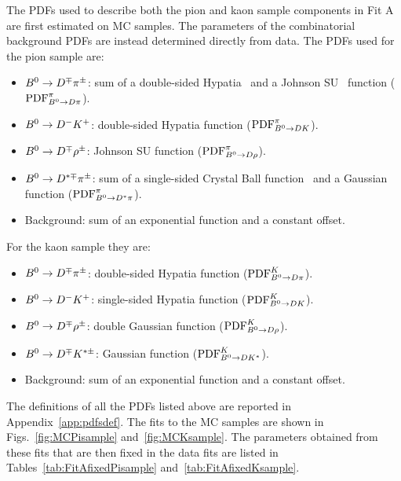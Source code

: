 The PDFs used to describe both the pion and kaon sample
components in Fit A are first estimated on MC samples. The parameters of the
combinatorial background PDFs are instead determined directly from data. The PDFs
used for the pion sample are:
\begin{itemize}[noitemsep,topsep=0pt]
	\item $B^0\rightarrow D^\mp\pi^\pm$: sum of a double-sided Hypatia~\cite{Hypatia} and a Johnson SU~\cite{JohnsonSU} function (${\rm PDF}^{\pi}_{B^0\rightarrow D\pi}$).
	\item $B^0\rightarrow D^-K^+$: double-sided Hypatia function (${\rm PDF}^{\pi}_{B^0\rightarrow DK}$).
	\item $B^0\rightarrow D^\mp\rho^\pm$: Johnson SU function (${\rm PDF}^{\pi}_{B^0\rightarrow D\rho}$).
	\item $B^0\rightarrow D^{*\mp}\pi^\pm$: sum of a single-sided Crystal Ball function~\cite{Skwarnicki:1986xj} and a Gaussian function (${\rm PDF}^{\pi}_{B^0\rightarrow D^*\pi}$).
	\item Background: sum of an exponential function and a constant offset.
\end{itemize}
For the kaon sample they are:
\begin{itemize}[noitemsep,topsep=0pt]
	\item $B^0\rightarrow D^\mp\pi^\pm$: double-sided Hypatia function (${\rm PDF}^{K}_{B^0\rightarrow D\pi}$).
	\item $B^0\rightarrow D^-K^+$: single-sided Hypatia function (${\rm PDF}^{K}_{B^0\rightarrow DK}$).
	\item $B^0\rightarrow D^\mp\rho^\pm$: double Gaussian function (${\rm PDF}^{K}_{B^0\rightarrow D\rho}$).
	\item $B^0\rightarrow D^\mp K^{*\pm}$: Gaussian function (${\rm PDF}^{K}_{B^0\rightarrow DK^*}$).
	\item Background: sum of an exponential function and a constant offset.
\end{itemize}
The definitions of all the PDFs listed above are reported in
Appendix~\ref{app:pdfsdef}. The fits to the MC samples are shown in
Figs.~\ref{fig:MCPisample} and~\ref{fig:MCKsample}. The parameters obtained from these fits that are then fixed in the data fits are listed in Tables~\ref{tab:FitAfixedPisample} and~\ref{tab:FitAfixedKsample}.

